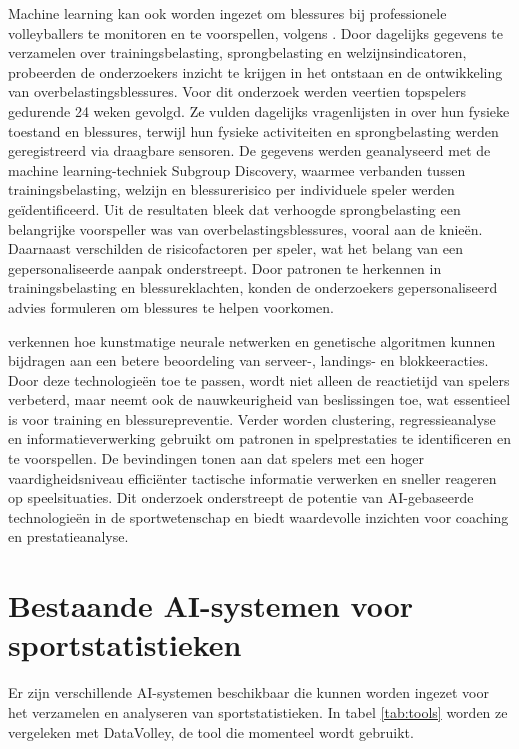 Machine learning kan ook worden ingezet om blessures bij professionele volleyballers te monitoren en te voorspellen, volgens \textcite{Leeuw2021}. Door dagelijks gegevens te verzamelen over trainingsbelasting, sprongbelasting en welzijnsindicatoren, probeerden de onderzoekers inzicht te krijgen in het ontstaan en de ontwikkeling van overbelastingsblessures.
Voor dit onderzoek werden veertien topspelers gedurende 24 weken gevolgd. Ze vulden dagelijks vragenlijsten in over hun fysieke toestand en blessures, terwijl hun fysieke activiteiten en sprongbelasting werden geregistreerd via draagbare sensoren. De gegevens werden geanalyseerd met de machine learning-techniek Subgroup Discovery, waarmee verbanden tussen trainingsbelasting, welzijn en blessurerisico per individuele speler werden geïdentificeerd.
Uit de resultaten bleek dat verhoogde sprongbelasting een belangrijke voorspeller was van overbelastingsblessures, vooral aan de knieën. Daarnaast verschilden de risicofactoren per speler, wat het belang van een gepersonaliseerde aanpak onderstreept. Door patronen te herkennen in trainingsbelasting en blessureklachten, konden de onderzoekers gepersonaliseerd advies formuleren om blessures te helpen voorkomen.

\textcite{Yu2022} verkennen hoe kunstmatige neurale netwerken en genetische algoritmen kunnen bijdragen aan een betere beoordeling van serveer-, landings- en blokkeeracties. Door deze technologieën toe te passen, wordt niet alleen de reactietijd van spelers verbeterd, maar neemt ook de nauwkeurigheid van beslissingen toe, wat essentieel is voor training en blessurepreventie.
Verder worden clustering, regressieanalyse en informatieverwerking gebruikt om patronen in spelprestaties te identificeren en te voorspellen. De bevindingen tonen aan dat spelers met een hoger vaardigheidsniveau efficiënter tactische informatie verwerken en sneller reageren op speelsituaties. Dit onderzoek onderstreept de potentie van AI-gebaseerde technologieën in de sportwetenschap en biedt waardevolle inzichten voor coaching en prestatieanalyse.

\section{Bestaande AI-systemen voor sportstatistieken}
Er zijn verschillende AI-systemen beschikbaar die kunnen worden ingezet voor het verzamelen en analyseren van sportstatistieken. In tabel \ref{tab:tools} worden ze vergeleken met DataVolley, de tool die momenteel wordt gebruikt.

